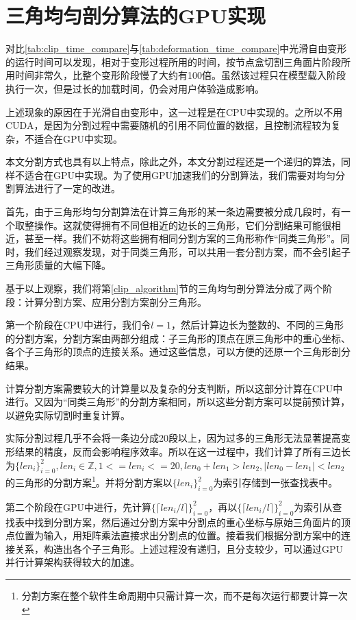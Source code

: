 \section{三角均匀剖分算法的GPU实现}
    对比\autoref{tab:clip_time_compare}与\autoref{tab:deformation_time_compare}中光滑自由变形的运行时间可以发现，相对于变形过程所用的时间，按节点盒切割三角面片阶段所用时间非常久，比整个变形阶段慢了大约有100倍。虽然该过程只在模型载入阶段执行一次，但是过长的加载时间，仍会对用户体验造成影响。

    上述现象的原因在于光滑自由变形中，这一过程是在CPU中实现的。之所以不用CUDA，是因为分割过程中需要随机的引用不同位置的数据，且控制流程较为复杂，不适合在GPU中实现。

    本文分割方式也具有以上特点，除此之外，本文分割过程还是一个递归的算法，同样不适合在GPU中实现。为了使用GPU加速我们的分割算法，我们需要对均匀分割算法进行了一定的改进。

    首先，由于三角形均匀分割算法在计算三角形的某一条边需要被分成几段时，有一个取整操作。这就使得拥有不同但相近的边长的三角形，它们分割结果可能很相近，甚至一样。我们不妨将这些拥有相同分割方案的三角形称作“同类三角形”。同时，我们经过观察发现，对于同类三角形，可以共用一套分割方案，而不会引起子三角形质量的大幅下降。

    基于以上观察，我们将第\autoref{clip_algorithm}节的三角均匀剖分算法分成了两个阶段：计算分割方案、应用分割方案剖分三角形。


    第一个阶段在CPU中进行，我们令$l=1$，然后计算边长为整数的、不同的三角形的分割方案，分割方案由两部分组成：子三角形的顶点在原三角形中的重心坐标、各个子三角形的顶点的连接关系。通过这些信息，可以方便的还原一个三角形剖分结果。

    计算分割方案需要较大的计算量以及复杂的分支判断，所以这部分计算在CPU中进行。又因为“同类三角形”的分割方案相同，所以这些分割方案可以提前预计算，以避免实际切割时重复计算。

    实际分割过程几乎不会将一条边分成20段以上，因为过多的三角形无法显著提高变形结果的精度，反而会影响程序效率。所以在这一过程中，我们计算了所有三边长为$\{len_i\}^{2}_{i=0}, len_i \in \mathbb{Z}, 1 <= len_i <= 20, len_0 + len_1 > len_2, |len_0 - len_1| < len_2$的三角形的分割方案\footnote{分割方案在整个软件生命周期中只需计算一次，而不是每次运行都要计算一次}。并将分割方案以$\{len_i\}^{2}_{i=0}$为索引存储到一张查找表中。


    第二个阶段在GPU中进行，先计算$\{\lceil len_i/l \rceil\}^{2}_{i=0}$，再以$\{\lceil len_i/l \rceil\}^{2}_{i=0}$为索引从查找表中找到分割方案，然后通过分割方案中分割点的重心坐标与原始三角面片的顶点位置为输入，用矩阵乘法直接求出分割点的位置。接着我们根据分割方案中的连接关系，构造出各个子三角形。上述过程没有递归，且分支较少，可以通过GPU并行计算架构获得较大的加速。


